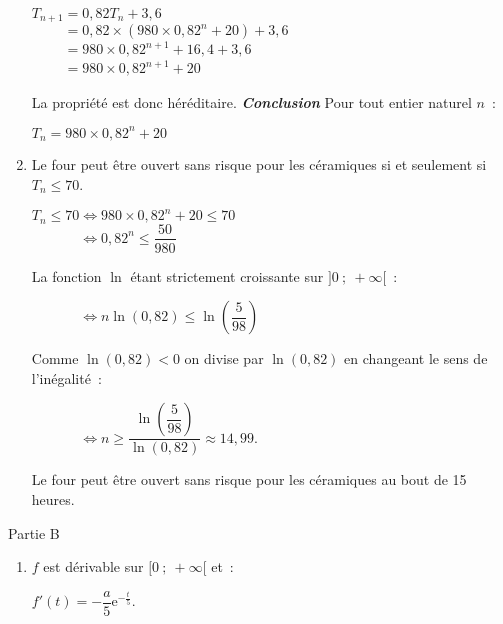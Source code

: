 \begin{corrige}
\begin{enumerate}
          \par
          $T_{n+1}=0,82T_n+3,6$\\
          $\phantom{T_{n+1}}=0,82\times \left( 980 \times 0,82^n + 20\right) +3,6$\\
          $\phantom{T_{n+1}}=980 \times 0,82^{n+1} + 16,4+3,6 $\\
          $\phantom{T_{n+1}}=980 \times 0,82^{n+1} + 20 $\\
          \par
          La propriété est donc héréditaire.
          \smallskip
          \textbf{\textit{Conclusion}}
          \smallskip
          Pour tout entier naturel $n$~:
          \begin{center}$ T_n=980 \times 0,82^n + 20 $\end{center}
          \item
          Le four peut être ouvert sans risque pour les céramiques si et seulement si $T_n \leqslant 70$.
          \par
          $T_n \leqslant 70 \Leftrightarrow 980 \times 0,82^n + 20 \leqslant 70$\\
          $\phantom{T_n \leqslant 70} \Leftrightarrow 0,82^n \leqslant \dfrac{50}{980}$
          \par
          La fonction $\ln$ étant strictement croissante sur $]0~;~+\infty[$~:
          \par
          $\phantom{T_n \leqslant 70} \Leftrightarrow n\ln(0,82) \leqslant \ln\left( \dfrac{5}{98}\right)$
          \par
          Comme $\ln(0,82)<0$ on divise par $\ln(0,82)$ en changeant le sens de l'inégalité~:
          \par
          $\phantom{T_n \leqslant 70} \Leftrightarrow  n \geqslant \dfrac{\ln\left( \dfrac{5}{98}\right)}{\ln(0,82)}\approx 14,99.$
          \par
          Le four peut être ouvert sans risque pour les céramiques au bout de 15 heures.
     \end{enumerate}
     \begin{center}\begin{h3}Partie B \end{h3}\end{center}
     \begin{enumerate}
          \item
          $f$ est dérivable sur $[0~;~+\infty[$ et~:
          \par
          $f'(t)=-\dfrac{a}{5}\text{e}^{-\frac{t}{5}}$.
          \par

\end{enumerate}
\end{corrige}
